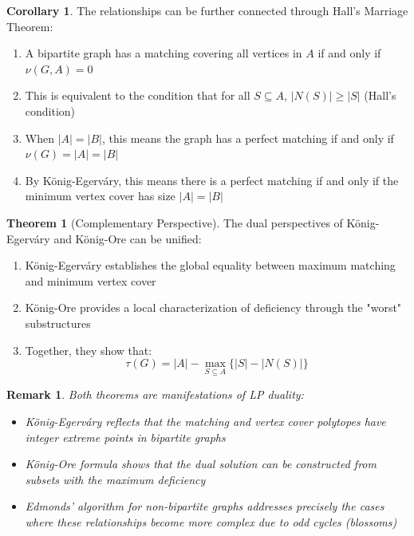\documentclass{article}
\newtheorem{remark}{Remark}
\theoremstyle{definition}
\newtheorem{theorem}{Theorem}
\newtheorem{corollary}{Corollary}
\begin{document}
\begin{corollary}
The relationships can be further connected through Hall's Marriage Theorem:
\begin{enumerate}
    \item A bipartite graph has a matching covering all vertices in $A$ if and only if $\nu(G, A) = 0$
    \item This is equivalent to the condition that for all $S \subseteq A$, $|N(S)| \geq |S|$ (Hall's condition)
    \item When $|A| = |B|$, this means the graph has a perfect matching if and only if $\nu(G) = |A| = |B|$
    \item By König-Egerváry, this means there is a perfect matching if and only if the minimum vertex cover has size $|A| = |B|$
\end{enumerate}
\end{corollary}

\begin{theorem}[Complementary Perspective]
The dual perspectives of König-Egerváry and König-Ore can be unified:
\begin{enumerate}
    \item König-Egerváry establishes the global equality between maximum matching and minimum vertex cover
    \item König-Ore provides a local characterization of deficiency through the "worst" substructures
    \item Together, they show that:
    \[
    \tau(G) = |A| - \max_{S \subseteq A} \{|S| - |N(S)|\}
    \]
\end{enumerate}
\end{theorem}

\begin{remark}
Both theorems are manifestations of LP duality:
\begin{itemize}
    \item König-Egerváry reflects that the matching and vertex cover polytopes have integer extreme points in bipartite graphs
    \item König-Ore formula shows that the dual solution can be constructed from subsets with the maximum deficiency
    \item Edmonds' algorithm for non-bipartite graphs addresses precisely the cases where these relationships become more complex due to odd cycles (blossoms)
\end{itemize}
\end{remark}

\pagebreak
\newpage
\clearpage
\end{document}
